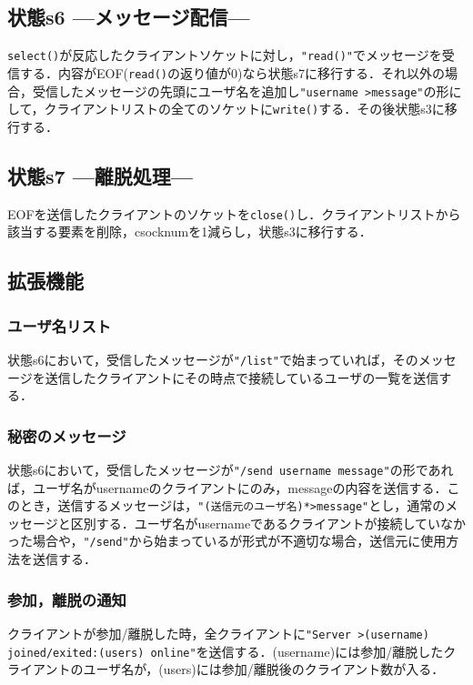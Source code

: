 \documentclass[a4j,10pt,titlepage]{jsarticle}
\begin{document}
\subsection{状態s6 ---メッセージ配信---}
\verb|select()|が反応したクライアントソケットに対し，\verb|"read()"|でメッセージを受信する．内容がEOF(\verb|read()|の返り値が0)なら状態s7に移行する．それ以外の場合，受信したメッセージの先頭にユーザ名を追加し\verb|"username >message"|の形にして，クライアントリストの全てのソケットに\verb|write()|する．その後状態s3に移行する．

\subsection{状態s7 ---離脱処理---}
EOFを送信したクライアントのソケットを\verb|close()|し．クライアントリストから該当する要素を削除，csocknumを1減らし，状態s3に移行する．

\subsection{拡張機能}\label{sec:extsrv}
\subsubsection{ユーザ名リスト}
状態s6において，受信したメッセージが\verb|"/list"|で始まっていれば，そのメッセージを送信したクライアントにその時点で接続しているユーザの一覧を送信する．

\subsubsection{秘密のメッセージ}
状態s6において，受信したメッセージが\verb|"/send username message"|の形であれば，ユーザ名がusernameのクライアントにのみ，messageの内容を送信する．このとき，送信するメッセージは，\verb|"(送信元のユーザ名)*>message"|とし，通常のメッセージと区別する．ユーザ名がusernameであるクライアントが接続していなかった場合や，\verb|"/send"|から始まっているが形式が不適切な場合，送信元に使用方法を送信する．

\subsubsection{参加，離脱の通知}
クライアントが参加/離脱した時，全クライアントに\verb|"Server >(username) joined/exited:(users) online"|を送信する．(username)には参加/離脱したクライアントのユーザ名が，(users)には参加/離脱後のクライアント数が入る．
\end{document}
